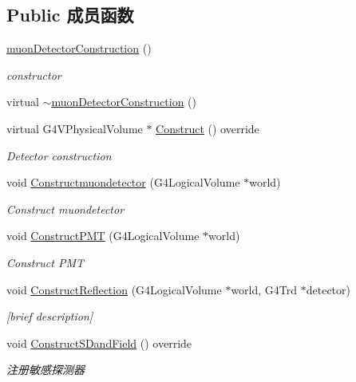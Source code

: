 \subsection*{Public 成员函数}
\begin{DoxyCompactItemize}
\item 
\hyperlink{classmuonDetectorConstruction_ad2b397202446a2fb7d563a8122cd5ecc}{muon\+Detector\+Construction} ()
\begin{DoxyCompactList}\small\item\em constructor \end{DoxyCompactList}\item 
virtual \hyperlink{classmuonDetectorConstruction_a97e2173fda2b16324447693de3b31609}{$\sim$muon\+Detector\+Construction} ()
\item 
virtual G4\+V\+Physical\+Volume $\ast$ \hyperlink{classmuonDetectorConstruction_ae06d0e4ad5f07bc1465a7faeccfdd19d}{Construct} () override
\begin{DoxyCompactList}\small\item\em Detector construction \end{DoxyCompactList}\item 
void \hyperlink{classmuonDetectorConstruction_a69f2bf6d3288ca6a311ac07c2fbfc86d}{Constructmuondetector} (G4\+Logical\+Volume $\ast$world)
\begin{DoxyCompactList}\small\item\em Construct muondetector \end{DoxyCompactList}\item 
void \hyperlink{classmuonDetectorConstruction_adaaf850335c5d3013e8e98270610e7b3}{Construct\+P\+MT} (G4\+Logical\+Volume $\ast$world)
\begin{DoxyCompactList}\small\item\em Construct P\+MT \end{DoxyCompactList}\item 
void \hyperlink{classmuonDetectorConstruction_ae448b2b2b572072f685b4cdf75d4f60a}{Construct\+Reflection} (G4\+Logical\+Volume $\ast$world, G4\+Trd $\ast$detector)
\begin{DoxyCompactList}\small\item\em \mbox{[}brief description\mbox{]} \end{DoxyCompactList}\item 
void \hyperlink{classmuonDetectorConstruction_ab730c9af042466f6464c77a62a3c75df}{Construct\+S\+Dand\+Field} () override
\begin{DoxyCompactList}\small\item\em 注册敏感探测器 \end{DoxyCompactList}\end{DoxyCompactItemize}
